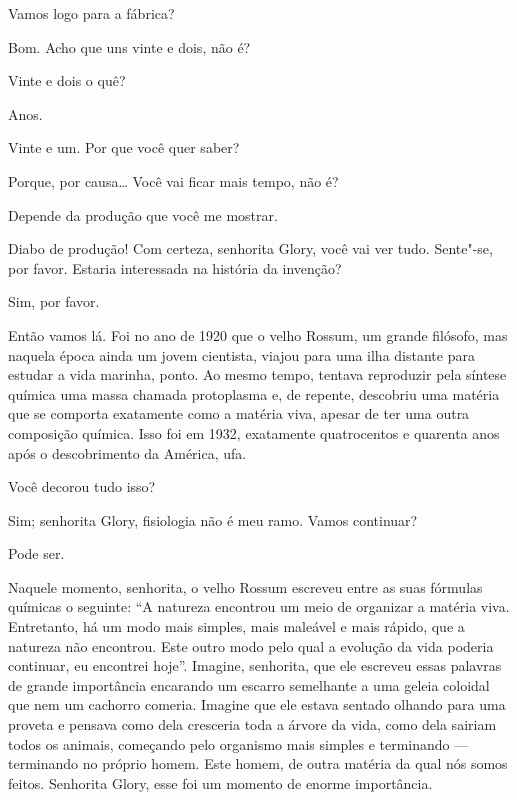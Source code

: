  Vamos logo para a fábrica?

 Bom. Acho que uns vinte e dois, não é?

 Vinte e dois o quê?

 Anos.

 Vinte e um. Por que você quer saber?

 Porque, por causa\ldots{}  Você vai ficar mais tempo,
não é?

 Depende da produção que você me mostrar.

 Diabo de produção! Com certeza, senhorita Glory, você vai ver tudo.
Sente"-se, por favor. Estaria interessada na história da invenção?

 Sim, por favor. 

 Então vamos lá.  Foi no ano de 1920 que o velho Rossum,
um grande filósofo, mas naquela época ainda um jovem cientista, viajou para uma
ilha distante para estudar a vida marinha, ponto. Ao mesmo tempo, tentava
reproduzir pela síntese química uma massa chamada protoplasma e, de repente,
descobriu uma matéria que se comporta exatamente como a matéria viva, apesar de
ter uma outra composição química. Isso foi em 1932, exatamente
quatrocentos e quarenta anos após o descobrimento da América, ufa.

 Você decorou tudo isso?

 Sim; senhorita Glory, fisiologia não é meu ramo. Vamos continuar?

 Pode ser.

  Naquele momento, senhorita, o velho Rossum escreveu
entre as suas fórmulas químicas o seguinte: ``A natureza encontrou um meio de
organizar a matéria viva. Entretanto, há um modo mais simples, mais maleável e
mais rápido, que a natureza não encontrou. Este outro modo pelo qual a evolução da vida poderia
continuar, eu encontrei hoje''. Imagine, senhorita, que ele
escreveu essas palavras de grande importância encarando um escarro semelhante a
uma geleia coloidal que nem um cachorro comeria. Imagine que ele estava sentado
olhando para uma proveta e pensava como dela cresceria toda a árvore da vida,
como dela sairiam todos os animais, começando pelo organismo mais simples e
terminando --- terminando no próprio homem. Este homem, de outra matéria da qual
nós somos feitos. Senhorita Glory, esse foi um momento de enorme importância.

